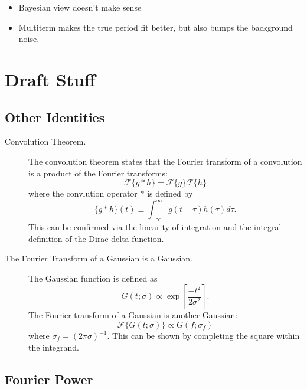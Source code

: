 \documentclass[preprint]{aastex}
\begin{document}
\begin{itemize}
\item Bayesian view doesn't make sense
\item Multiterm makes the true period fit better, but also bumps the background noise.
\end{itemize}




\newpage

\section{Draft Stuff}

\subsection{Other Identities}

\begin{description}
\item[Convolution Theorem.]
    The convolution theorem states that the
    Fourier transform of a convolution is a product of the Fourier transforms:
    \begin{equation}
      \mathcal{F}\{g \ast h\} = \mathcal{F}\{g\}\mathcal{F}\{h\}
    \end{equation}
    where the convlution operator $\ast$ is defined by
    \begin{equation}
      \{g \ast h\}(t) \equiv \int_{-\infty}^\infty g(t - \tau) h(\tau) d\tau.
    \end{equation}
    This can be confirmed via the linearity of integration and the integral
    definition of the Dirac delta function.
\item[The Fourier Transform of a Gaussian is a Gaussian.]
    The Gaussian function is defined as
    \begin{equation}
    G(t;\sigma) \propto \exp\left[\frac{-t^2}{2\sigma^2}\right].
    \end{equation}
    The Fourier transform of a Gaussian is another Gaussian:
    \begin{equation}
    \mathcal{F}\{G(t;\sigma)\} \propto G(f; \sigma_f)
    \end{equation}
    where $\sigma_f = (2\pi\sigma)^{-1}$. This can be shown by completing the
    square within the integrand.
\end{description}

\subsection{Fourier Power}
\end{document}
